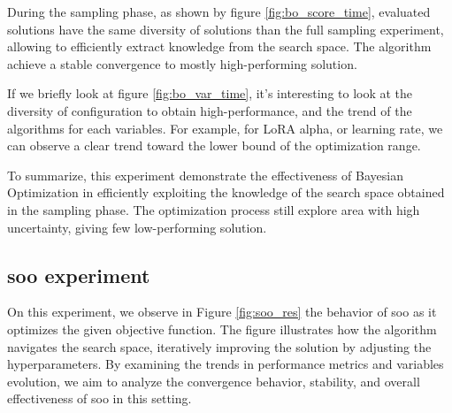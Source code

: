During the sampling phase, as shown by figure \ref{fig:bo_score_time}, evaluated solutions have the same diversity of solutions than the full sampling experiment, allowing to efficiently extract knowledge from the search space. The algorithm achieve a stable convergence to mostly high-performing solution.

If we briefly look at figure \ref{fig:bo_var_time}, it's interesting to look at the diversity of configuration to obtain high-performance, and the trend of the algorithms for each variables. For example, for LoRA alpha, or learning rate, we can observe a clear trend toward the lower bound of the optimization range. 

To summarize, this experiment demonstrate the effectiveness of Bayesian Optimization in efficiently exploiting the knowledge of the search space obtained in the sampling phase. The optimization process still explore area with high uncertainty, giving few low-performing solution.


\subsection{\acrshort{soo} experiment}
\label{sec:soo_exp}

On this experiment, we observe in Figure \ref{fig:soo_res} the behavior of \acrshort{soo} as it optimizes the given objective function. The figure illustrates how the algorithm navigates the search space, iteratively improving the solution by adjusting the hyperparameters. By examining the trends in performance metrics and variables evolution, we aim to analyze the convergence behavior, stability, and overall effectiveness of \acrshort{soo} in this setting.

